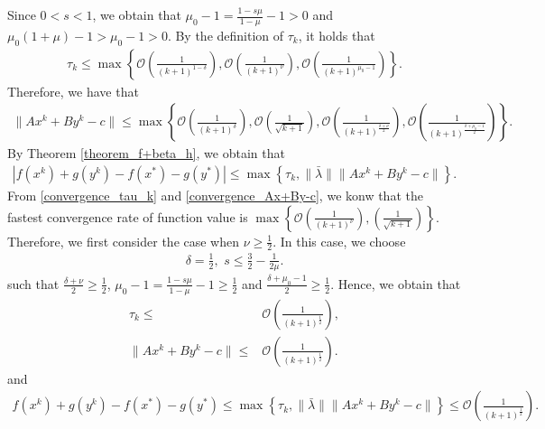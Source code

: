 \documentclass{article}
\numberwithin{equation}{section}
\begin{document}
Since $0<s<1$, we obtain that $\mu_0 -1 =\frac{1-s\mu}{1-\mu}-1 >0$ and $\mu_0(1+\mu)-1>\mu_0-1>0$. 
By the definition of $\tau_k$, it holds that 
\begin{align}
    \tau_k \leq \max\left\{ \mathcal{O}\left(\frac{1}{(k+1)^{1-\delta}}\right), 
    \mathcal{O}\left(\frac{1}{(k+1)^{\nu}}\right),\mathcal{O}\left(\frac{1}{(k+1)^{\mu_0-1}}\right) \right\}. \label{convergence_tau_k}
\end{align}
Therefore, we have that
\begin{align}
    \|Ax^k+ By^k -c\rVert \leq \max\left\{\mathcal{O}\left( \frac{1}{(k+1)^{\delta}} \right), 
    \mathcal{O}\left( \frac{1}{\sqrt{k+1}}\right), \mathcal{O}\left( \frac{1}{(k+1)^{\frac{\delta+\nu}{2}}}\right), 
    \mathcal{O}\left( \frac{1}{(k+1)^{\frac{\delta+\mu_0-1}{2}}}\right)\right\}. \label{convergence_Ax+By-c}
\end{align} 
By Theorem \ref{theorem_f+beta_h}, we obtain that 
\begin{align}
    \left|f(x^k)+g(y^k) -f(x^*) -g(y^*)\right| \leq \max\left\{ \tau_k, \|\bar{\lambda}\rVert\|Ax^k+By^k-c\rVert \right\}. \nonumber
\end{align}
From \eqref{convergence_tau_k} and \eqref{convergence_Ax+By-c}, we konw that the fastest convergence rate 
of function value is $\max\left\{ \mathcal{O}\left( \frac{1}{(k+1)^{\nu}} \right), \left( \frac{1}{\sqrt{k+1}} \right) \right\}$. 
Therefore, we first consider the case when $\nu \geq \frac{1}{2}$. 
In this case,  we choose
\begin{align}
    \delta = \frac{1}{2}, \hspace{4pt}  s\leq \frac{3}{2} -\frac{1}{2\mu}. 
\end{align}
such that $\frac{\delta+\nu}{2} \geq \frac{1}{2}$, $\mu_0-1=\frac{1-s\mu}{1-\mu}-1\geq \frac{1}{2}$ and 
$\frac{\delta+\mu_0-1}{2}\geq \frac{1}{2}$. 
Hence, we obtain that 
\begin{align}
    \tau_k \leq&  \mathcal{O}\left( \frac{1}{(k+1)^{\frac{1}{2}}} \right), \nonumber \\
    \|Ax^k+ By^k -c\rVert \leq& \mathcal{O} \left( \frac{1}{(k+1)^{\frac{1}{2}}} \right). \nonumber
\end{align}
and 
\begin{align}
    f(x^k)+g(y^k) -f(x^*) -g(y^*) \leq \max\left\{ \tau_k, \|\bar{\lambda}\rVert\|Ax^k+By^k-c\rVert \right\} 
    \leq \mathcal{O} \left( \frac{1}{(k+1)^{\frac{1}{2}}} \right). \nonumber 
\end{align}
\end{document}
